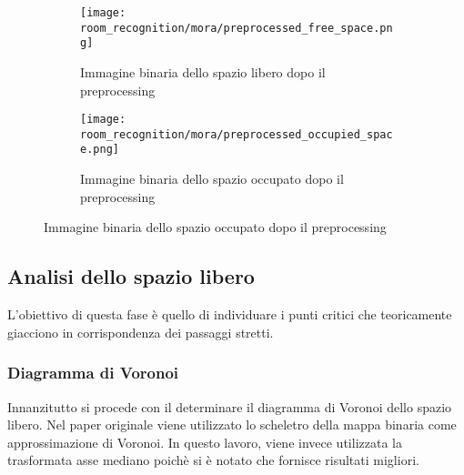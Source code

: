 \begin{figure}[H]
  \begin{subfigure}[t]{0.45\textwidth}
    \centering
    \texttt{[image: room\_recognition/mora/preprocessed\_free\_space.png]}
    \caption{Immagine binaria dello spazio libero dopo il preprocessing}
  \end{subfigure}
  \hfill
  \begin{subfigure}[t]{0.45\textwidth}
    \centering
    \texttt{[image: room\_recognition/mora/preprocessed\_occupied\_space.png]}
    \caption{Immagine binaria dello spazio occupato dopo il preprocessing}
  \end{subfigure}
\end{figure}

\subsection{Analisi dello spazio libero}
L'obiettivo di questa fase è quello di individuare i punti critici che teoricamente giacciono in corrispondenza dei passaggi stretti.

\subsubsection{Diagramma di Voronoi}
Innanzitutto si procede con il determinare il diagramma di Voronoi dello spazio libero. Nel paper originale viene utilizzato lo scheletro della mappa binaria come approssimazione di Voronoi. In questo lavoro, viene invece utilizzata la trasformata asse mediano poichè si è notato che fornisce risultati migliori.


